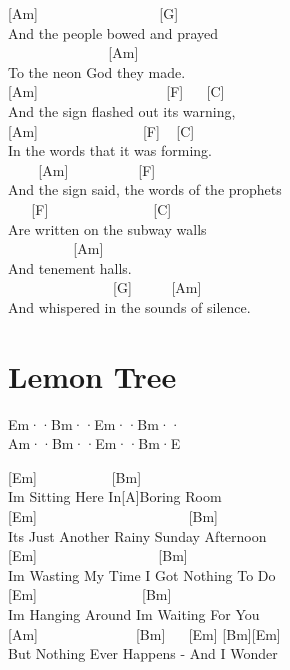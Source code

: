 \documentclass[
  letterpaper,
  twoside=false]{scrbook}
\begin{document}
{[}Am{]} ~ ~ ~ ~ ~ ~ ~ ~ ~ ~ {[}G{]}\\
And the people bowed and prayed\\
\hspace*{0.333em} ~ ~ ~ ~ ~ ~ ~ ~ ~{[}Am{]}\\
To the neon God they made.\\
{[}Am{]} ~ ~ ~ ~ ~ ~ ~ ~ ~ ~ ~{[}F{]} ~ ~{[}C{]}\\
And the sign flashed out its warning,\\
{[}Am{]} ~ ~ ~ ~ ~ ~ ~ ~ ~{[}F{]} ~ {[}C{]}\\
In the words that it was forming.\\
\hspace*{0.333em} ~ ~ ~{[}Am{]} ~ ~ ~ ~ ~ ~{[}F{]}\\
And the sign said, the words of the prophets\\
\hspace*{0.333em} ~ ~ {[}F{]} ~ ~ ~ ~ ~ ~ ~ ~ ~{[}C{]}\\
Are written on the subway walls\\
\hspace*{0.333em} ~ ~ ~ ~ ~ ~{[}Am{]}\\
And tenement halls.\\
\hspace*{0.333em} ~ ~ ~ ~ ~ ~ ~ ~ ~ {[}G{]} ~ ~ ~ {[}Am{]} ~ ~\\
And whispered in the sounds of silence.

\hypertarget{lemon-tree}{%
\chapter{Lemon Tree}\label{lemon-tree}}

Em··\textbar Bm··\textbar Em··\textbar Bm··\textbar{}\\
Am··\textbar Bm··\textbar Em··\textbar Bm·E\textbar{}

{[}Em{]} ~ ~ ~ ~ ~ ~ {[}Bm{]}\\
I\textquotesingle m Sitting Here In{[}A{]}Boring Room\\
{[}Em{]} ~ ~ ~ ~ ~ ~ ~ ~ ~ ~ ~ ~ ~{[}Bm{]}\\
It\textquotesingle s Just Another Rainy Sunday Afternoon\\
{[}Em{]} ~ ~ ~ ~ ~ ~ ~ ~ ~ ~ {[}Bm{]}\\
I\textquotesingle m Wasting My Time I Got Nothing To Do\\
{[}Em{]} ~ ~ ~ ~ ~ ~ ~ ~ ~{[}Bm{]}\\
I\textquotesingle m Hanging Around I\textquotesingle m Waiting For You\\
\hspace*{0.333em} {[}Am{]} ~ ~ ~ ~ ~ ~ ~ ~ {[}Bm{]} ~ ~{[}Em{]}
{[}Bm{]}{[}Em{]}\\
But Nothing Ever Happens - And I Wonder
\end{document}
